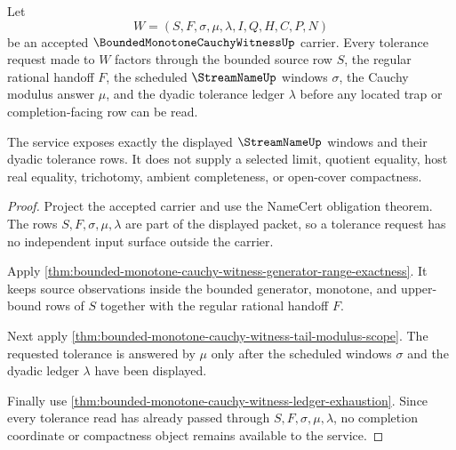 \begin{theorem}
\label{thm:bounded-monotone-cauchy-witness-tail-window-service}
Let
$$
W=(S,F,\sigma,\mu,\lambda,I,Q,H,C,P,N)
$$
be an accepted $\BoundedMonotoneCauchyWitnessUp$ carrier. Every tolerance request made to $W$ factors through the bounded source row $S$, the regular rational handoff $F$, the scheduled $\StreamNameUp$ windows $\sigma$, the Cauchy modulus answer $\mu$, and the dyadic tolerance ledger $\lambda$ before any located trap or completion-facing row can be read.

The service exposes exactly the displayed $\StreamNameUp$ windows and their dyadic tolerance rows. It does not supply a selected limit, quotient equality, host real equality, trichotomy, ambient completeness, or open-cover compactness.
\end{theorem}
\begin{proof}
Project the accepted carrier and use the NameCert obligation theorem. The rows $S,F,\sigma,\mu,\lambda$ are part of the displayed packet, so a tolerance request has no independent input surface outside the carrier.

Apply \autoref{thm:bounded-monotone-cauchy-witness-generator-range-exactness}. It keeps source observations inside the bounded generator, monotone, and upper-bound rows of $S$ together with the regular rational handoff $F$.

Next apply \autoref{thm:bounded-monotone-cauchy-witness-tail-modulus-scope}. The requested tolerance is answered by $\mu$ only after the scheduled windows $\sigma$ and the dyadic ledger $\lambda$ have been displayed.

Finally use \autoref{thm:bounded-monotone-cauchy-witness-ledger-exhaustion}. Since every tolerance read has already passed through $S,F,\sigma,\mu,\lambda$, no completion coordinate or compactness object remains available to the service.
\end{proof}


